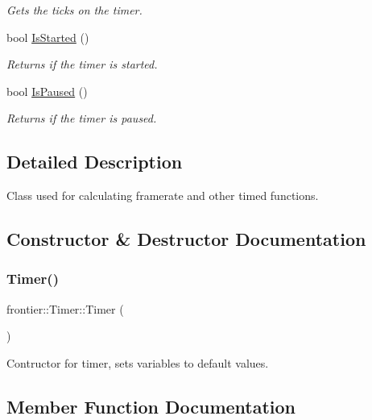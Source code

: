 \begin{DoxyCompactItemize}
\begin{DoxyCompactList}\small\item\em Gets the ticks on the timer. \end{DoxyCompactList}\item 
bool \hyperlink{classfrontier_1_1_timer_a955bac73463eb53813b84c945f0b9327}{Is\+Started} ()
\begin{DoxyCompactList}\small\item\em Returns if the timer is started. \end{DoxyCompactList}\item 
bool \hyperlink{classfrontier_1_1_timer_ab1436c1f41e9226977fc8500b6fe3b41}{Is\+Paused} ()
\begin{DoxyCompactList}\small\item\em Returns if the timer is paused. \end{DoxyCompactList}\end{DoxyCompactItemize}


\subsection{Detailed Description}
Class used for calculating framerate and other timed functions. 

\subsection{Constructor \& Destructor Documentation}
\mbox{\label{classfrontier_1_1_timer_a6aac1ba4a567320f54e8eee841e9c43b}} 
\subsubsection{\texorpdfstring{Timer()}{Timer()}}
{\footnotesize\ttfamily frontier\+::\+Timer\+::\+Timer (\begin{DoxyParamCaption}{ }\end{DoxyParamCaption})}



Contructor for timer, sets variables to default values. 



\subsection{Member Function Documentation}
\mbox{\label{classfrontier_1_1_timer_ac34abf0e1fada4f0b1f97087c6b6747f}} 

